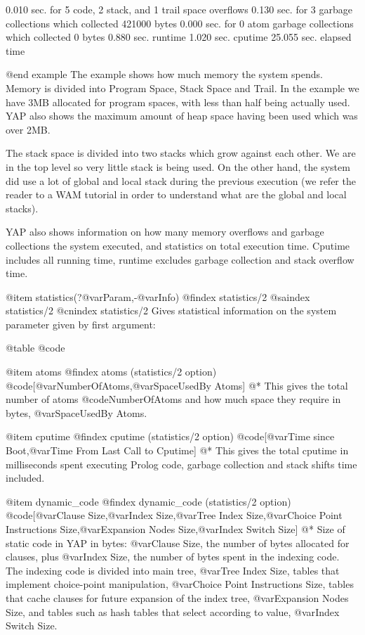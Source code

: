 {{{{{{       0.010 sec. for 5 code, 2 stack, and 1 trail space overflows
       0.130 sec. for 3 garbage collections which collected 421000 bytes
       0.000 sec. for 0 atom garbage collections which collected 0 bytes
       0.880 sec. runtime
       1.020 sec. cputime
      25.055 sec. elapsed time

@end example
The example shows how much memory the system spends. Memory is divided
into Program Space, Stack Space and Trail. In the example we have 3MB
allocated for program spaces, with less than half being actually
used. YAP also shows the maximum amount of heap space having been used
which was over 2MB.

The stack space is divided into two stacks which grow against each
other. We are in the top level so very little stack is being used. On
the other hand, the system did use a lot of global and local stack
during the previous execution (we refer the reader to a WAM tutorial in
order to understand what are the global and local stacks).

YAP also shows information on how many memory overflows and garbage
collections the system executed, and statistics on total execution
time. Cputime includes all running time, runtime excludes garbage
collection and stack overflow time.

@item statistics(?@var{Param},-@var{Info})
@findex statistics/2
@saindex statistics/2
@cnindex statistics/2
Gives statistical information on the system parameter given by first
argument:

@table @code

@item atoms
@findex atoms (statistics/2 option)
@code{[@var{NumberOfAtoms},@var{SpaceUsedBy Atoms}]}
@* 
This gives the total number of atoms @code{NumberOfAtoms} and how much
space they require in bytes, @var{SpaceUsedBy Atoms}.

@item cputime
@findex cputime (statistics/2 option)
@code{[@var{Time since Boot},@var{Time From Last Call to Cputime}]}
@* 
This gives the total cputime in milliseconds spent executing Prolog code,
garbage collection and stack shifts time included.

@item dynamic_code
@findex dynamic_code (statistics/2 option)
@code{[@var{Clause Size},@var{Index Size},@var{Tree Index
Size},@var{Choice Point Instructions
Size},@var{Expansion Nodes Size},@var{Index Switch Size}]}
@*
Size of static code in YAP in bytes: @var{Clause Size}, the number of
bytes allocated for clauses, plus
@var{Index Size}, the number of bytes spent in the indexing code. The
indexing code is divided into main tree, @var{Tree Index
Size}, tables that implement choice-point manipulation, @var{Choice Point Instructions
Size}, tables that cache clauses for future expansion of the index
tree, @var{Expansion Nodes Size}, and 
tables such as hash tables that select according to value,  @var{Index Switch Size}.

}}}}}}
